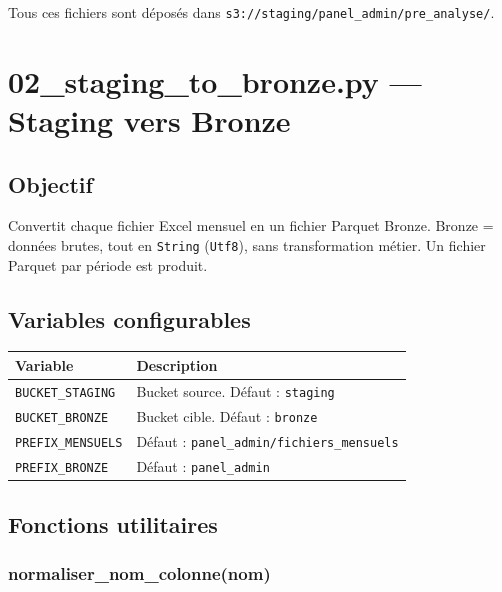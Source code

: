 \documentclass[12pt,a4paper,french]{report}
\newcommand{\bucket}[1]{\texttt{s3://#1}}
\begin{document}
Tous ces fichiers sont déposés dans
\bucket{staging/panel\_admin/pre\_analyse/}.

\section{02\_staging\_to\_bronze.py — Staging vers Bronze}

\subsection{Objectif}

Convertit chaque fichier Excel mensuel en un fichier Parquet Bronze. Bronze =
données brutes, tout en \texttt{String} (\texttt{Utf8}), sans transformation
métier. Un fichier Parquet par période est produit.

\subsection{Variables configurables}

\begin{tabularx}{\textwidth}{lX}
  \toprule
  \textbf{Variable} & \textbf{Description} \\
  \midrule
  \texttt{BUCKET\_STAGING} & Bucket source. Défaut : \texttt{staging} \\
  \texttt{BUCKET\_BRONZE} & Bucket cible. Défaut : \texttt{bronze} \\
  \texttt{PREFIX\_MENSUELS} &
    Défaut : \texttt{panel\_admin/fichiers\_mensuels} \\
  \texttt{PREFIX\_BRONZE} & Défaut : \texttt{panel\_admin} \\
  \bottomrule
\end{tabularx}

\subsection{Fonctions utilitaires}

\subsubsection{normaliser\_nom\_colonne(nom)}
\end{document}
